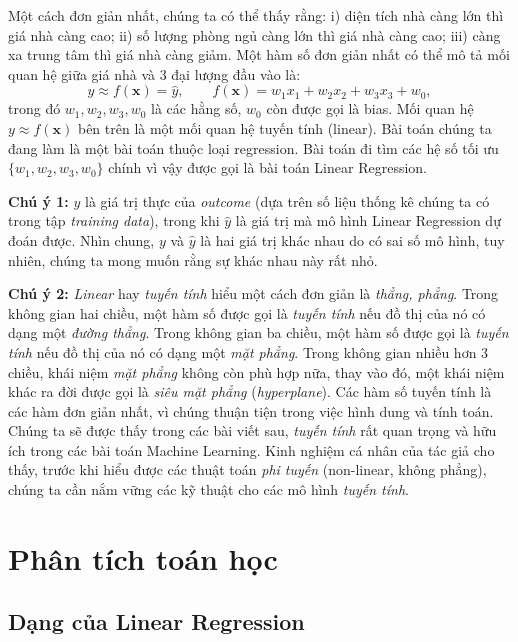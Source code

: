 \documentclass[runningheads]{llncs}
\begin{document}
Một cách đơn giản nhất, chúng ta có thể thấy rằng: i) diện tích nhà càng lớn
thì giá nhà càng cao; ii) số lượng phòng ngủ càng lớn thì giá nhà càng cao;
iii) càng xa trung tâm thì giá nhà càng giảm. Một hàm số đơn giản nhất có thể
mô tả mối quan hệ giữa giá nhà và 3 đại lượng đầu vào là:
\begin{equation}
\label{eq:model}
y \approx f(\mathbf{x}) = \hat{y}, \qquad
f(\mathbf{x}) = w_1 x_1 + w_2 x_2 + w_3 x_3 + w_0,
\end{equation}
trong đó $w_1, w_2, w_3, w_0$ là các hằng số, $w_0$ còn được gọi là bias.
Mối quan hệ $y \approx f(\mathbf{x})$ bên trên là một mối quan hệ tuyến tính
(linear). Bài toán chúng ta đang làm là một bài toán thuộc loại regression.
Bài toán đi tìm các hệ số tối ưu $\{w_1, w_2, w_3, w_0\}$ chính vì vậy được
gọi là bài toán Linear Regression.

\textbf{Chú ý 1:} $y$ là giá trị thực của \emph{outcome} (dựa trên số liệu
thống kê chúng ta có trong tập \emph{training data}), trong khi $\hat{y}$ là
giá trị mà mô hình Linear Regression dự đoán được. Nhìn chung, $y$ và
$\hat{y}$ là hai giá trị khác nhau do có sai số mô hình, tuy nhiên, chúng ta
mong muốn rằng sự khác nhau này rất nhỏ.

\textbf{Chú ý 2:} \emph{Linear} hay \emph{tuyến tính} hiểu một cách đơn giản
là \emph{thẳng, phẳng}. Trong không gian hai chiều, một hàm số được gọi là
\emph{tuyến tính} nếu đồ thị của nó có dạng một \emph{đường thẳng}. Trong
không gian ba chiều, một hàm số được gọi là \emph{tuyến tính} nếu đồ thị của
nó có dạng một \emph{mặt phẳng}. Trong không gian nhiều hơn 3 chiều, khái
niệm \emph{mặt phẳng} không còn phù hợp nữa, thay vào đó, một khái niệm khác
ra đời được gọi là \emph{siêu mặt phẳng} (\emph{hyperplane}). Các hàm số
tuyến tính là các hàm đơn giản nhất, vì chúng thuận tiện trong việc hình dung
và tính toán. Chúng ta sẽ được thấy trong các bài viết sau, \emph{tuyến tính}
rất quan trọng và hữu ích trong các bài toán Machine Learning. Kinh nghiệm cá
nhân của tác giả cho thấy, trước khi hiểu được các thuật toán \emph{phi tuyến}
(non-linear, không phẳng), chúng ta cần nắm vững các kỹ thuật cho các mô hình
\emph{tuyến tính}.

\section{Phân tích toán học}

\subsection{Dạng của Linear Regression}
\end{document}
